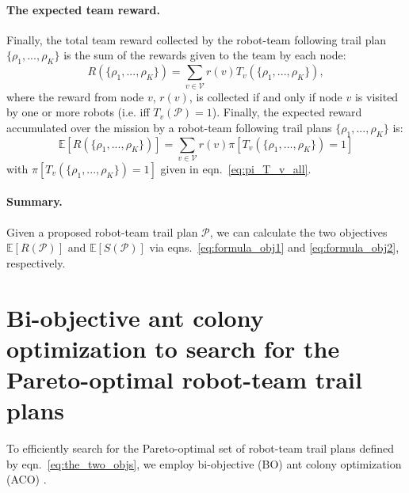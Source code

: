 \documentclass[11pt, oneside]{article}
\begin{document}
\paragraph{The expected team reward.}
Finally, the total team reward collected by the robot-team following trail plan $\{\rho_1, ..., \rho_K\}$ is the sum of the rewards given to the team by each node:
\begin{equation}
R(\{\rho_1,...,\rho_K\}) = \sum_{v\in\mathcal{V}} r(v)  T_v(\{\rho_1, ..., \rho_K\}),
\end{equation} where the reward from node $v$, $r(v)$, is collected if and only if node $v$ is visited by one or more robots (i.e. iff $T_v(\mathcal{P})=1$).
Finally, the expected reward accumulated over the mission by a robot-team following trail plans $\{\rho_1, ..., \rho_K\}$ is:
\begin{equation}
	\mathbb{E}[R(\{\rho_1,...,\rho_K\})]= \sum_{v\in\mathcal{V}} r(v) \pi[T_v(\{\rho_1, ..., \rho_K\}) = 1] \label{eq:formula_obj1}
\end{equation}
with $ \pi[T_v(\{\rho_1, ..., \rho_K\}) = 1]$ given in eqn.~\ref{eq:pi_T_v_all}.

\paragraph{Summary.} Given a proposed robot-team trail plan $\mathcal{P}$, we can calculate the two objectives $\mathbb{E}[R(\mathcal{P})]$ and $\mathbb{E}[S(\mathcal{P})]$ via eqns.~\ref{eq:formula_obj1} and \ref{eq:formula_obj2}, respectively.

\section{Bi-objective ant colony optimization to search for the Pareto-optimal robot-team trail plans}
To efficiently search for the Pareto-optimal set of robot-team trail plans defined by eqn.~\ref{eq:the_two_objs}, we employ bi-objective (BO) ant colony optimization (ACO) \cite{iredi2001bi}. 
\end{document}
